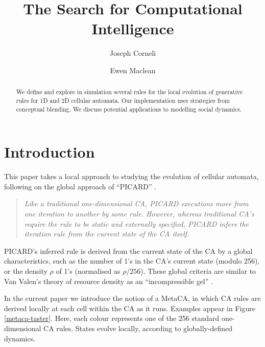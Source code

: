 \documentclass{AISB2008}
\newcommand*{\sourceatright}[1]{\unskip\hspace{1em plus 1fill}%
\nolinebreak[3]\hspace*{\fill}\mbox{#1}}%
\begin{document}
\title{The Search for Computational Intelligence}

\author{Joseph Corneli
\and
Ewen Maclean
}

\maketitle


\begin{abstract}
We define and explore in simulation several rules for the local
evolution of generative rules for 1D and 2D cellular automata.  Our
implementation uses strategies from conceptual blending.  We discuss
potential applications to modelling social dynamics.
\end{abstract}

\section{Introduction}

This paper takes a local approach to studying the evolution of
cellular automata, following on the global approach of ``PICARD''
\cite{pavlic2014self}.

\begin{quote}
\emph{Like a traditional one-dimensional CA, PICARD executions move
  from one iteration to another by some rule. However, whereas
  traditional CA's require the rule to be static and externally
  specified, PICARD infers the iteration rule from the current state
  of the CA itself.}
\sourceatright{\cite[pp. 1--2]{pavlic2014self}}
\end{quote}

PICARD's inferred rule is derived from the current state of the CA by
a global characteristics, such as the number of 1's in the CA's
current state (modulo 256), or the density $\rho$ of 1's (normalised
as $\rho/256$).  These global criteria are similar to Van Valen's
theory of resource density as an ``incompressible gel'' \cite{van1973new}.

In the current paper we introduce the notion of a MetaCA, in which CA
rules are derived locally at each cell within the CA as it runs.
Examples appear in Figure \ref{metaca-taster}.  Here, each colour
represents one of the 256 standard one-dimensional CA rules.  States
evolve locally, according to globally-defined dynamics.
\end{document}
